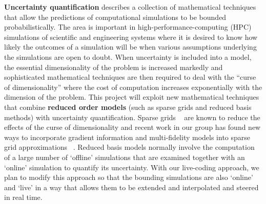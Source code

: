 {\bf Uncertainty quantification} describes a collection of
mathematical techniques that allow the predictions of computational
simulations to be bounded probabilistically. The area is important in
high-performance-computing (HPC) simulations of scientific and
engineering systems where it is desired to know how likely the
outcomes of a simulation will be when various assumptions underlying
the simulations are open to doubt. When uncertainty is included into a
model, the essential dimensionality of the problem is increased
markedly and sophisticated mathematical techniques are then required
to deal with the “curse of dimensionality” where the cost of
computation increases exponentially with the dimension of the
problem. This project will exploit new mathematical techniques that
combine {\bf reduced order models} (such as sparse grids and reduced
basis methods) with uncertainty quantification. Sparse grids
~\parencite{BungartzGriebel2004} are known to reduce the effects of
the curse of dimensionality and recent work in our group has found new
ways to incorporate gradient information and multi-fidelity models
into sparse grid approximations
~\parencite{deBaarHarding2015,Jakeman2015,deBaarRDM2015}.  Reduced
basis models normally involve the computation of a large number of
`offline' simulations that are examined together with an `online'
simulation to quantify its uncertainty. With our live-coding approach,
we plan to modify this approach so that the bounding simulations are
also  `online' and `live' in a way that allows them to be extended and
interpolated and steered in real time.

\iffalse
When uncertainty is included into a model, the essential
dimensionality of the problem is increased markedly.  New and more
sophisticated techniques are then required to deal with the so called
`curse of dimensionality', where the cost of computation increases
exponentially with the dimension of the problem.  The mathematical
component of this project will be based on new developments combining
reduced order models (such as sparse grids and reduced basis methods)
with uncertainty quantification.  Sparse
grids~\parencite{BungartzGriebel2004} are known to reduce the effects
of the curse of dimensionality and recent work in our group has found
new ways to incorporate gradient information and multi-fidelity models
into sparse grid
approximations~\parencite{deBaarHarding2015,Jakeman2015,deBaarRDM2015}.
We will extend this work to construct efficient techniques for
incorporating uncertainty information into storm surge-tsunami models.
Reduced basis methods~\parencite{quarteroni2015reduced} provide an
alternative approach for constructing reduced order models and will
also be investigated.
\fi


